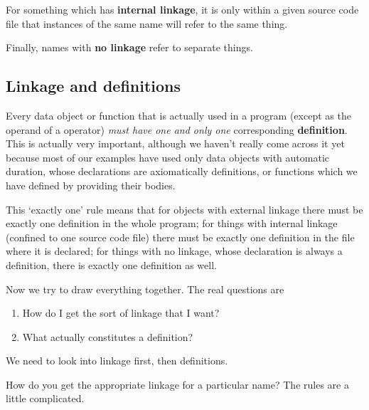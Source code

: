    For something which has \textbf{internal linkage}, it is only within
    a given source code file that instances of the same name will refer to
    the same thing.


   Finally, names with \textbf{no linkage} refer to separate
    things.


  

  \subsection{Linkage and definitions}
   

   Every data object or function that is actually used in a program
    (except as the operand of a \sizeof{} operator) \textit{must have
    one and only one} corresponding \textbf{definition}. This is
    actually very important, although we haven't really come across it yet
    because most of our examples have used only data objects with automatic
    duration, whose declarations are axiomatically definitions, or functions
    which we have defined by providing their bodies.


   This `exactly one' rule means that for objects with external
    linkage there must be exactly one definition in the whole program; for
    things with internal linkage (confined to one source code file) there
    must be exactly one definition in the file where it is declared; for
    things with no linkage, whose declaration is always a definition, there
    is exactly one definition as well.


   Now we try to draw everything together. The real questions are


   \begin{enumerate}
    \item How do I get the sort of linkage that I want?
    \item What actually constitutes a definition?
   \end{enumerate}

   We need to look into linkage first, then definitions.


   How do you get the appropriate linkage for a particular name? The
    rules are a little complicated.



